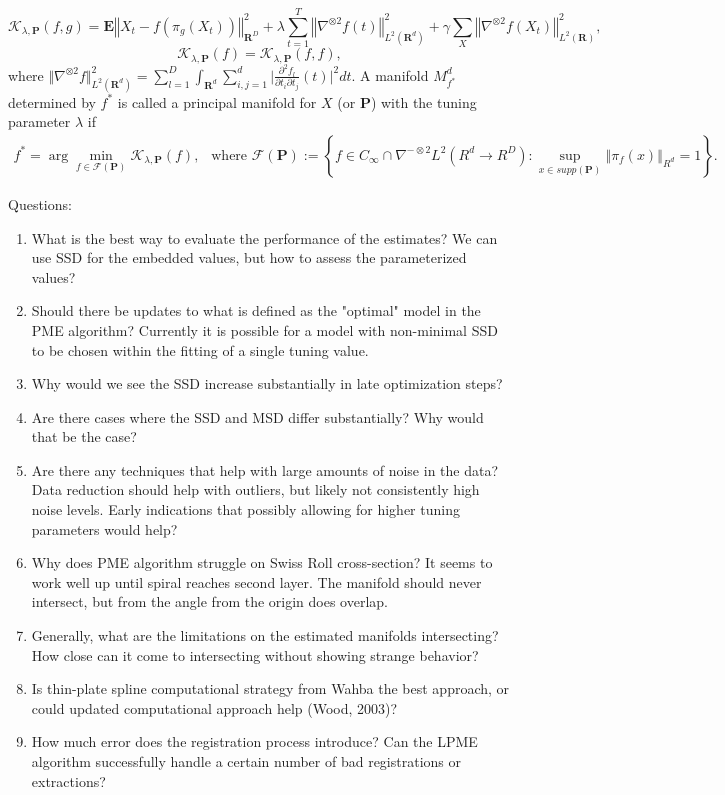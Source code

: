 \documentclass[11pt,reqno]{article}
\begin{document}
	\begin{equation}\label{PMSEF}
	\mathcal{K}_{\lambda,\mathbf{P}}(f,g)=\mathbf{E}\left\Vert X_t - f\left(\pi_g(X_t)\right)\right\Vert^2_{\mathbf{R}^D} + \lambda \sum_{t = 1}^T \left\Vert\nabla^{\otimes 2} f(t)\right\Vert_{L^2(\mathbf{R}^d)}^2 + \gamma \sum_{X} \left\Vert\nabla^{\otimes 2} f(X_t)\right\Vert_{L^2(\mathbf{R})}^2, 
	\end{equation}
	\begin{equation}\nonumber
	\mathcal{K}_{\lambda,\mathbf{P}}(f)=\mathcal{K}_{\lambda,\mathbf{P}}(f,f),
	\end{equation}
	where $\Vert\nabla^{\otimes 2}f \Vert_{L^2(\mathbf{R}^d)}^2 = \sum_{l=1}^D\int_{\mathbf{R}^d} \sum_{i,j=1}^d\vert\frac{\partial^2 f_l}{\partial t_i \partial t_j}(t)\vert^2dt$. A manifold $M_{f^*}^d$ determined by $f^*$ is called a principal manifold for $X$ (or $\mathbf{P}$) with the tuning parameter $\lambda$ if 
	\begin{align}\label{def: PM}
	f^*=\arg\min_{f\in\mathscr{F}(\mathbf{P})}\mathcal{K}_{\lambda,\mathbf{P}}(f),\ \ \mbox{ where }\mathscr{F}(\mathbf{P}):=\left\{f\in C_\infty\cap \nabla^{-\otimes 2}L^2( R^d \rightarrow R^D):\sup_{x\in supp(\mathbf{P})}\left\Vert\pi_f(x)\right\Vert_{R^d} = 1 \right\}.
	\end{align}

Questions:
\begin{enumerate}
  \item What is the best way to evaluate the performance of the estimates? We can use SSD for the embedded values, but how to assess the parameterized values?
  \item Should there be updates to what is defined as the "optimal" model in the PME algorithm? Currently it is possible for a model with non-minimal SSD to be chosen within the fitting of a single tuning value.
  \item Why would we see the SSD increase substantially in late optimization steps?
  \item Are there cases where the SSD and MSD differ substantially? Why would that be the case?
  \item Are there any techniques that help with large amounts of noise in the data? Data reduction should help with outliers, but likely not consistently high noise levels. Early indications that possibly allowing for higher tuning parameters would help?
  \item Why does PME algorithm struggle on Swiss Roll cross-section? It seems to work well up until spiral reaches second layer. The manifold should never intersect, but from the angle from the origin does overlap.
  \item Generally, what are the limitations on the estimated manifolds intersecting? How close can it come to intersecting without showing strange behavior?
  \item Is thin-plate spline computational strategy from Wahba the best approach, or could updated computational approach help (Wood, 2003)?
  \item How much error does the registration process introduce? Can the LPME algorithm successfully handle a certain number of bad registrations or extractions?
\end{enumerate}

\nocite{*}


\end{document}
